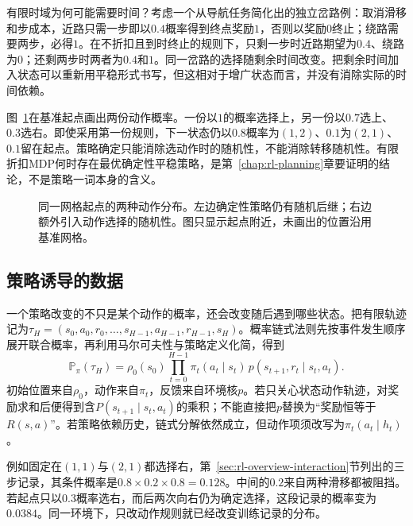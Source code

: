 有限时域为何可能需要时间？考虑一个从导航任务简化出的独立岔路例：取消滑移和步成本，近路只需一步即以$0.4$概率得到终点奖励$1$，否则以奖励$0$终止；绕路需要两步，必得$1$。在不折扣且到时终止的规则下，只剩一步时近路期望为$0.4$、绕路为$0$；还剩两步时两者为$0.4$和$1$。同一岔路的选择随剩余时间改变。把剩余时间加入状态可以重新用平稳形式书写，但这相对于增广状态而言，并没有消除实际的时间依赖。

图~\ref{fig:rl-overview-policy-randomness}在基准起点画出两份动作概率。一份以$1$的概率选择上，另一份以$0.7$选上、$0.3$选右。即使采用第一份规则，下一状态仍以$0.8$概率为$(1,2)$、$0.1$为$(2,1)$、$0.1$留在起点。策略确定只能消除选动作时的随机性，不能消除转移随机性。有限折扣MDP何时存在最优确定性平稳策略，是第~\ref{chap:rl-planning}章要证明的结论，不是策略一词本身的含义。

\begin{figure}[htbp]
  \centering
  
  \caption{同一网格起点的两种动作分布。左边确定性策略仍有随机后继；右边额外引入动作选择的随机性。图只显示起点附近，未画出的位置沿用基准网格。}
  \label{fig:rl-overview-policy-randomness}
\end{figure}

\subsection{策略诱导的数据}
\label{sec:rl-overview-occupancy}

一个策略改变的不只是某个动作的概率，还会改变随后遇到哪些状态。把有限轨迹记为$\tau_H=(s_0,a_0,r_0,\ldots,s_{H-1},a_{H-1},r_{H-1},s_H)$。概率链式法则先按事件发生顺序展开联合概率，再利用马尔可夫性与策略定义化简，得到
\begin{equation}
  \mathbb P_\pi(\tau_H)
  =\rho_0(s_0)\prod_{t=0}^{H-1}
    \pi_t(a_t\mid s_t)\,p(s_{t+1},r_t\mid s_t,a_t).
  \label{eq:rl-overview-trajectory}
\end{equation}
初始位置来自$\rho_0$，动作来自$\pi_t$，反馈来自环境核$p$。若只关心状态动作轨迹，对奖励求和后便得到含$P(s_{t+1}\mid s_t,a_t)$的乘积；不能直接把$p$替换为“奖励恒等于$R(s,a)$”。若策略依赖历史，链式分解依然成立，但动作项须改写为$\pi_t(a_t\mid h_t)$。

例如固定在$(1,1)$与$(2,1)$都选择右，第~\ref{sec:rl-overview-interaction}节列出的三步记录，其条件概率是$0.8\times0.2\times0.8=0.128$。中间的$0.2$来自两种滑移都被阻挡。若起点只以$0.3$概率选右，而后两次向右仍为确定选择，这段记录的概率变为$0.0384$。同一环境下，只改动作规则就已经改变训练记录的分布。

